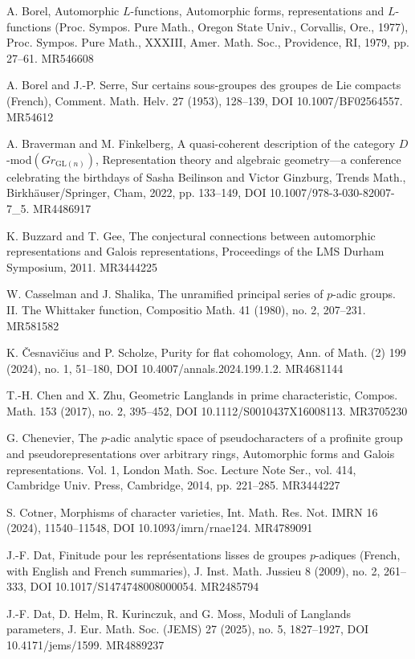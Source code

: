 \begin{refs}
\item[{[9]}] A. Borel, Automorphic $L$-functions, Automorphic forms, representations and $L$-functions (Proc. Sympos. Pure Math., Oregon State Univ., Corvallis, Ore., 1977), Proc. Sympos. Pure Math., XXXIII, Amer. Math. Soc., Providence, RI, 1979, pp. 27--61. MR546608
\item[{[10]}] A. Borel and J.-P. Serre, Sur certains sous-groupes des groupes de Lie compacts (French), Comment. Math. Helv. 27 (1953), 128--139, DOI 10.1007/BF02564557. MR54612
\item[{[11]}] A. Braverman and M. Finkelberg, A quasi-coherent description of the category $D$-mod$(Gr_{\mathrm{GL}(n)})$, Representation theory and algebraic geometry---a conference celebrating the birthdays of Sasha Beilinson and Victor Ginzburg, Trends Math., Birkh\"auser/Springer, Cham, 2022, pp. 133--149, DOI 10.1007/978-3-030-82007-7\_5. MR4486917
\item[{[12]}] K. Buzzard and T. Gee, The conjectural connections between automorphic representations and Galois representations, Proceedings of the LMS Durham Symposium, 2011. MR3444225
\item[{[13]}] W. Casselman and J. Shalika, The unramified principal series of $p$-adic groups. II. The Whittaker function, Compositio Math. 41 (1980), no. 2, 207--231. MR581582
\item[{[14]}] K. \v{C}esnavi\v{c}ius and P. Scholze, Purity for flat cohomology, Ann. of Math. (2) 199 (2024), no. 1, 51--180, DOI 10.4007/annals.2024.199.1.2. MR4681144
\item[{[15]}] T.-H. Chen and X. Zhu, Geometric Langlands in prime characteristic, Compos. Math. 153 (2017), no. 2, 395--452, DOI 10.1112/S0010437X16008113. MR3705230
\item[{[16]}] G. Chenevier, The $p$-adic analytic space of pseudocharacters of a profinite group and pseudorepresentations over arbitrary rings, Automorphic forms and Galois representations. Vol. 1, London Math. Soc. Lecture Note Ser., vol. 414, Cambridge Univ. Press, Cambridge, 2014, pp. 221--285. MR3444227
\item[{[17]}] S. Cotner, Morphisms of character varieties, Int. Math. Res. Not. IMRN 16 (2024), 11540--11548, DOI 10.1093/imrn/rnae124. MR4789091
\item[{[18]}] J.-F. Dat, Finitude pour les repr\'esentations lisses de groupes $p$-adiques (French, with English and French summaries), J. Inst. Math. Jussieu 8 (2009), no. 2, 261--333, DOI 10.1017/S1474748008000054. MR2485794
\item[{[19]}] J.-F. Dat, D. Helm, R. Kurinczuk, and G. Moss, Moduli of Langlands parameters, J. Eur. Math. Soc. (JEMS) 27 (2025), no. 5, 1827--1927, DOI 10.4171/jems/1599. MR4889237

\end{refs}
